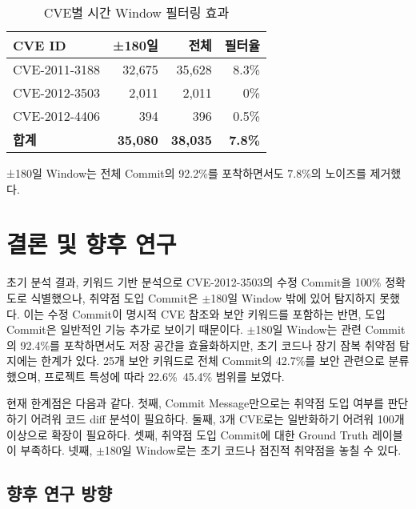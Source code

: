 ﻿\documentclass[conference]{IEEEtran}
\begin{document}
\begin{table}[h]
\centering
\caption{CVE별 시간 Window 필터링 효과}
\label{tab:time_window_effect}
\begin{tabular}{lrrr}
\toprule
\textbf{CVE ID} & \textbf{±180일} & \textbf{전체} & \textbf{필터율} \\
\midrule
CVE-2011-3188 & 32,675 & 35,628 & 8.3\% \\
CVE-2012-3503 & 2,011 & 2,011 & 0\% \\
CVE-2012-4406 & 394 & 396 & 0.5\% \\
\midrule
\textbf{합계} & \textbf{35,080} & \textbf{38,035} & \textbf{7.8\%} \\
\bottomrule
\end{tabular}
\end{table}

±180일 Window는 전체 Commit의 92.2\%를 포착하면서도 7.8\%의 노이즈를 제거했다.


\section{결론 및 향후 연구}

초기 분석 결과, 키워드 기반 분석으로 CVE-2012-3503의 수정 Commit을 100\% 정확도로 식별했으나, 취약점 도입 Commit은 $\pm$180일 Window 밖에 있어 탐지하지 못했다. 이는 수정 Commit이 명시적 CVE 참조와 보안 키워드를 포함하는 반면, 도입 Commit은 일반적인 기능 추가로 보이기 때문이다. $\pm$180일 Window는 관련 Commit의 92.4\%를 포착하면서도 저장 공간을 효율화하지만, 초기 코드나 장기 잠복 취약점 탐지에는 한계가 있다. 25개 보안 키워드로 전체 Commit의 42.7\%를 보안 관련으로 분류했으며, 프로젝트 특성에 따라 22.6\%~45.4\% 범위를 보였다.

현재 한계점은 다음과 같다. 첫째, Commit Message만으로는 취약점 도입 여부를 판단하기 어려워 코드 diff 분석이 필요하다. 둘째, 3개 CVE로는 일반화하기 어려워 100개 이상으로 확장이 필요하다. 셋째, 취약점 도입 Commit에 대한 Ground Truth 레이블이 부족하다. 넷째, $\pm$180일 Window로는 초기 코드나 점진적 취약점을 놓칠 수 있다.

\subsection{향후 연구 방향}
\end{document}
